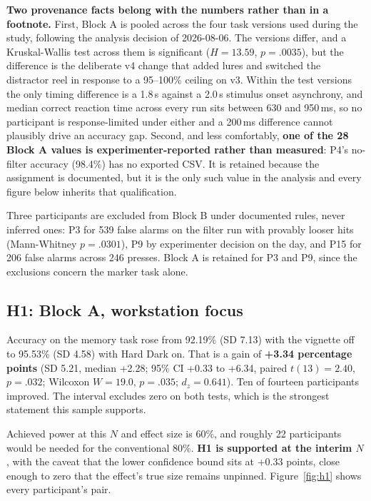 \textbf{Two provenance facts belong with the numbers rather than in a footnote.} First, Block A is
pooled across the four task versions used during the study, following the analysis decision of
2026-08-06. The versions differ, and a Kruskal-Wallis test across them is significant
($H = 13.59$, $p = .0035$), but the difference is the deliberate v4 change that added lures and
switched the distractor reel in response to a 95--100\% ceiling on v3. Within the test versions the
only timing difference is a 1.8\,s against a 2.0\,s stimulus onset asynchrony, and median correct
reaction time across every run sits between 630 and 950\,ms, so no participant is response-limited
under either and a 200\,ms difference cannot plausibly drive an accuracy gap. Second, and less
comfortably, \textbf{one of the 28 Block A values is experimenter-reported rather than measured}:
P4's no-filter accuracy (98.4\%) has no exported CSV. It is retained because the assignment is
documented, but it is the only such value in the analysis and every figure below inherits that
qualification.

Three participants are excluded from Block B under documented rules, never inferred ones: P3 for 539
false alarms on the filter run with provably looser hits (Mann-Whitney $p = .0301$), P9 by
experimenter decision on the day, and P15 for 206 false alarms across 246 presses. Block A is
retained for P3 and P9, since the exclusions concern the marker task alone.

\subsection{H1: Block A, workstation focus}

Accuracy on the memory task rose from 92.19\% (SD 7.13) with the vignette off to 95.53\% (SD 4.58)
with Hard Dark on. That is a gain of \textbf{+3.34 percentage points} (SD 5.21, median +2.28; 95\% CI
+0.33 to +6.34, paired $t(13) = 2.40$, $p = .032$; Wilcoxon $W = 19.0$, $p = .035$; $d_z = 0.641$).
Ten of fourteen participants improved. The interval excludes zero on both tests, which is the
strongest statement this sample supports.

Achieved power at this $N$ and effect size is 60\%, and roughly 22 participants would be needed for
the conventional 80\%. \textbf{H1 is supported at the interim $N$}, with the caveat that the lower
confidence bound sits at +0.33 points, close enough to zero that the effect's true size remains
unpinned. Figure~\ref{fig:h1} shows every participant's pair.

